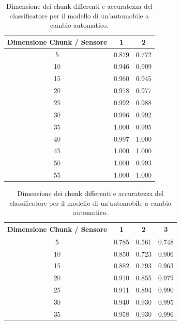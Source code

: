 \documentclass[Lau,binding=0.6cm,noexaminfo]{sapthesis}
\begin{document}
\begin{table}
    \begin{center}
        \begin{tabular}{|c|c|c|}
            \hline
            \textbf{Dimensione Chunk / Sensore} & \textbf{1} & \textbf{2} \\
            \hline
            5 & 0.879 & 0.772 \\
            \hline
            10 & 0.946 & 0.909 \\
            \hline
            15 & 0.960 & 0.945 \\
            \hline
            20 & 0.978 & 0.977 \\
            \hline
            25 & 0.992 & 0.988 \\
            \hline
            30 & 0.996 & 0.992 \\
            \hline
            35 & 1.000 & 0.995 \\
            \hline
            40 & 0.997 & 1.000 \\
            \hline
            45 & 1.000 & 1.000 \\
            \hline
            50 & 1.000 & 0.993 \\
            \hline
            55 & 1.000 & 1.000 \\
            \hline
        \end{tabular}
    \end{center}
    \caption{Dimensione dei chunk differenti e accuratezza del classificatore per il modello di un'automobile a cambio automatico.}
    \label{tab:2}
    \begin{center}
        \begin{tabular}{|c|c|c|c|}
            \hline
            \textbf{Dimensione Chunk / Sensore} & \textbf{1} & \textbf{2} & \textbf{3} \\
            \hline
            5 & 0.785 & 0.561 & 0.748 \\
            \hline
            10 & 0.850 & 0.723 & 0.906 \\
            \hline
            15 & 0.882 & 0.793 & 0.963 \\
            \hline
            20 & 0.910 & 0.855 & 0.979 \\
            \hline
            25 & 0.911 & 0.894 & 0.990 \\
            \hline
            30 & 0.940 & 0.930 & 0.995 \\
            \hline
            35 & 0.958 & 0.930 & 0.996 \\

\end{tabular}
\end{center}
\end{table}
\end{document}
